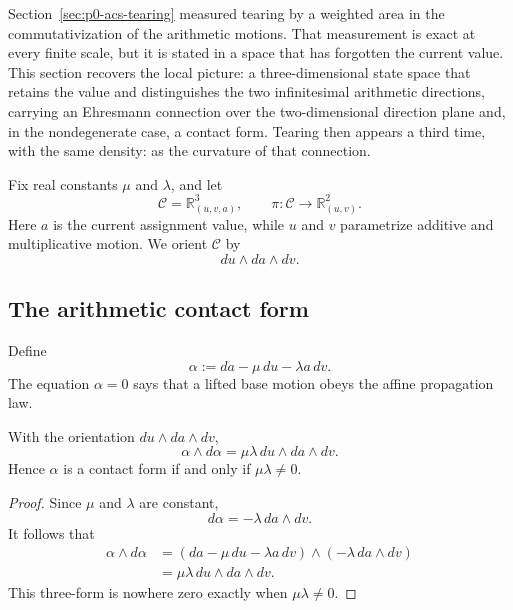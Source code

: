 Section~\ref{sec:p0-acs-tearing} measured tearing by a weighted area in the
commutativization of the arithmetic motions.  That measurement is exact at every
finite scale, but it is stated in a space that has forgotten the current value.
This section recovers the local picture: a three-dimensional state space that
retains the value and distinguishes the two infinitesimal arithmetic directions,
carrying an Ehresmann connection over the two-dimensional direction plane and,
in the nondegenerate case, a contact form.  Tearing then appears a third time,
with the same density: as the curvature of that connection.

Fix real constants \(\mu\) and \(\lambda\), and let
\[
    \mathcal C=\mathbb R^3_{(u,v,a)},
    \qquad
    \pi:\mathcal C\longrightarrow\mathbb R^2_{(u,v)}.
\]
Here \(a\) is the current assignment value, while \(u\) and \(v\) parametrize
additive and multiplicative motion.  We orient \(\mathcal C\) by
\[
    du\wedge da\wedge dv.
\]

\subsection{The arithmetic contact form}

Define
\begin{equation}
    \alpha:=da-\mu\,du-\lambda a\,dv.
    \label{eq:arithmetic-contact-form}
\end{equation}
The equation \(\alpha=0\) says that a lifted base motion obeys the affine
propagation law.

\begin{proposition}
\label{prop:contact-form}
With the orientation \(du\wedge da\wedge dv\),
\begin{equation}
    \alpha\wedge d\alpha
       =\mu\lambda\,du\wedge da\wedge dv.
    \label{eq:contact-volume-sign}
\end{equation}
Hence \(\alpha\) is a contact form if and only if \(\mu\lambda\ne0\).
\end{proposition}

\begin{proof}
Since \(\mu\) and \(\lambda\) are constant,
\[
    d\alpha=-\lambda\,da\wedge dv.
\]
It follows that
\begin{align*}
    \alpha\wedge d\alpha
      &=(da-\mu\,du-\lambda a\,dv)
        \wedge(-\lambda\,da\wedge dv)\\
      &=\mu\lambda\,du\wedge da\wedge dv.
\end{align*}
This three-form is nowhere zero exactly when \(\mu\lambda\ne0\).
\end{proof}

